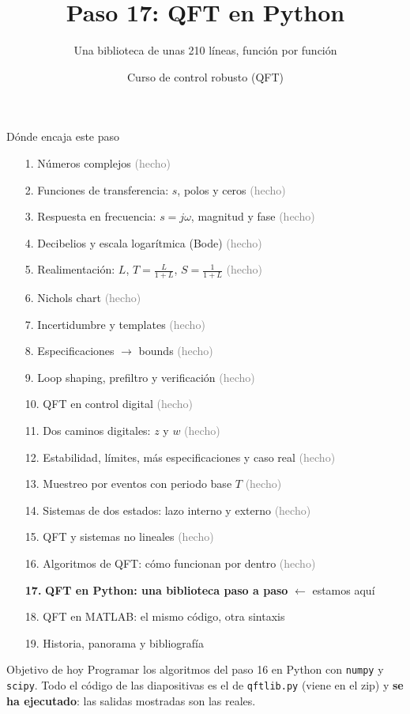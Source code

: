 \documentclass[aspectratio=169,11pt]{beamer}
\title[QFT en Python]{Paso 17: QFT en Python}
\subtitle{Una biblioteca de unas 210 líneas, función por función}
\author{Curso de control robusto (QFT)}
\date{}
\begin{document}
\begin{frame}\titlepage\end{frame}

\begin{frame}{Dónde encaja este paso}
  \tiny
  \begin{enumerate}\setlength{\itemsep}{-2pt}
    \item[1.] Números complejos \hfill \textcolor{gray}{(hecho)}
    \item[2.] Funciones de transferencia: $s$, polos y ceros \hfill \textcolor{gray}{(hecho)}
    \item[3.] Respuesta en frecuencia: $s=j\omega$, magnitud y fase \hfill \textcolor{gray}{(hecho)}
    \item[4.] Decibelios y escala logarítmica (Bode) \hfill \textcolor{gray}{(hecho)}
    \item[5.] Realimentación: $L$, $T=\frac{L}{1+L}$, $S=\frac{1}{1+L}$ \hfill \textcolor{gray}{(hecho)}
    \item[6.] Nichols chart \hfill \textcolor{gray}{(hecho)}
    \item[7.] Incertidumbre y templates \hfill \textcolor{gray}{(hecho)}
    \item[8.] Especificaciones $\rightarrow$ bounds \hfill \textcolor{gray}{(hecho)}
    \item[9.] Loop shaping, prefiltro y verificación \hfill \textcolor{gray}{(hecho)}
    \item[10.] QFT en control digital \hfill \textcolor{gray}{(hecho)}
    \item[11.] Dos caminos digitales: $z$ y $w$ \hfill \textcolor{gray}{(hecho)}
    \item[12.] Estabilidad, límites, más especificaciones y caso real \hfill \textcolor{gray}{(hecho)}
    \item[13.] Muestreo por eventos con periodo base $T$ \hfill \textcolor{gray}{(hecho)}
    \item[14.] Sistemas de dos estados: lazo interno y externo \hfill \textcolor{gray}{(hecho)}
    \item[15.] QFT y sistemas no lineales \hfill \textcolor{gray}{(hecho)}
    \item[16.] Algoritmos de QFT: cómo funcionan por dentro \hfill \textcolor{gray}{(hecho)}
    \item[\textbf{17.}] \textbf{QFT en Python: una biblioteca paso a paso} \hfill $\leftarrow$ estamos aquí
    \item[18.] QFT en MATLAB: el mismo código, otra sintaxis
    \item[19.] Historia, panorama y bibliografía
  \end{enumerate}
  \vspace{2pt}
  \begin{block}{Objetivo de hoy}
    \footnotesize
    Programar los algoritmos del paso 16 en Python con \texttt{numpy} y \texttt{scipy}. Todo el código de las diapositivas es el de \texttt{qftlib.py} (viene en el zip) y \textbf{se ha ejecutado}: las salidas mostradas son las reales.
  \end{block}
\end{frame}
\end{document}
